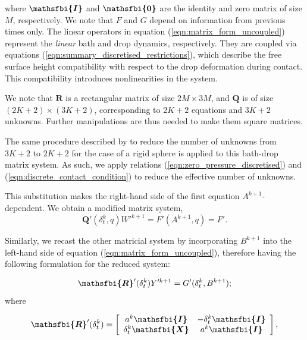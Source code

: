 \documentclass{jfm}
\newcommand{\bfjfm}[1]{\bm{\mathsfbi{#1}}}
\begin{document}
where $\bfjfm{I}$ and $\bfjfm{0}$ are the identity and zero matrix of size $M$, respectively. We note that $F$ and $G$ depend on information from previous times only. The linear operators in equation (\ref{eqn:matrix_form_uncoupled}) represent the \emph{linear} bath and drop dynamics, respectively. They are coupled via equations (\ref{eqn:summary_discretised_restrictions}), which describe the free surface height compatibility with respect to the drop deformation during contact. This compatibility introduces nonlinearities in the system. 

We note that $\mathbf{R}$ is a rectangular matrix of size $2M \times 3M$, and $\mathbf{Q}$ is of size $(2K+2) \times (3K+2)$, corresponding to $2K+2$ equations and $3K+2$ unknowns. Further manipulations are thus needed to make them square matrices. 

The same procedure described by \cite{GaleanoRiosEtAl2017} to reduce the number of unknowns from $3K+2$ to $2K+2$ for the case of a rigid sphere is applied to this bath-drop matrix system. As such, we apply relations (\ref{eqn:zero_pressure_discretised}) and (\ref{eqn:discrete_contact_condition}) to reduce the effective number of unknowns.

This substitution makes the right-hand side of the first equation $A^{k+1}$-dependent. We obtain a modified matrix system,
\begin{equation}\label{eqn:matrix_form_reduced_1}
    \mathbf{Q}'(\delta_t^k, q) W'^{k+1} = F'(A^{k+1}, q) = F'. 
\end{equation}

Similarly, we recast the other matricial system by incorporating $B^{k+1}$ into the left-hand side of equation (\ref{eqn:matrix_form_uncoupled}), therefore having the following formulation for the reduced system:

\begin{equation}
\label{eqn:matrix_form_reduced_2}
\bfjfm{R}' (\delta_t^k) Y'^{k+1} = G'(\delta_t^k, B^{k+1});
\end{equation}
where

\begin{equation}
     \label{eqn:bath_matrix_form_3}
     \bfjfm{R}'(\delta_t^k) 
     =
     \left[
    \begin{array}{cc}
        a^k\bfjfm{I} 
        & -\delta_t^k\bfjfm{I}
        \\
        \delta^k_t\bfjfm{X}
        & a^k \bfjfm{I} 
    \end{array}
    \right],
 \end{equation}
\end{document}
